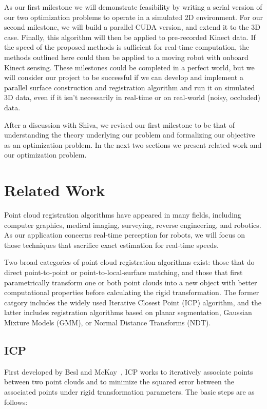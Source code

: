 \documentclass{article} %
\begin{document}
As our first milestone we will demonstrate feasibility by writing a serial version of our two optimization problems to operate in a simulated 2D environment. For our second milestone, we will build a parallel CUDA version, and extend it to the 3D case. Finally, this algorithm will then be applied to pre-recorded Kinect data. If the speed of the proposed methods is sufficient for real-time computation, the methods outlined here could then be applied to a moving robot with onboard Kinect sensing. These milestones could be completed in a perfect world, but we will consider our project to be successful if we can develop and implement a parallel surface construction and registration algorithm and run it on simulated 3D data, even if it isn't necessarily in real-time or on real-world (noisy, occluded) data. 

After a discussion with Shiva, we revised our first milestone to be that of understanding the theory underlying our problem and formalizing our objective as an optimization problem. In the next two sections we present related work and our optimization problem.

\section{Related Work}

Point cloud registration algorithms have appeared in many fields, including computer graphics, medical imaging, surveying, reverse engineering, and robotics. As our application concerns real-time perception for robots, we will focus on those techniques that sacrifice exact estimation for real-time speeds. 

Two broad categories of point cloud registration algorithms exist: those that do direct point-to-point or point-to-local-surface matching, and those that first parametrically transform one or both point clouds into a new object with better computational properties before calculating the rigid transformation. The former catgory includes the widely used Iterative Closest Point (ICP) algorithm, and the latter includes registration algorithms based on planar segmentation, Gaussian Mixture Models (GMM), or Normal Distance Transforms (NDT). 

\subsection{ICP}

First developed by Besl and McKay~\cite{besl_method_1992}, ICP works to iteratively associate points between two point clouds and to minimize the squared error between the associated points under rigid transformation parameters. The basic steps are as follows:
\end{document}
